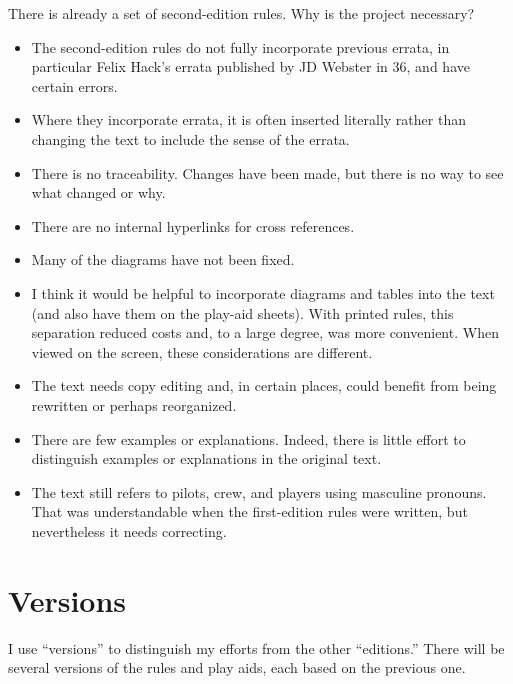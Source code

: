 \documentclass[10pt]{article}
\begin{document}
There is already a set of second-edition rules. Why is the project necessary?
\begin{itemize}
    \item The second-edition rules do not fully incorporate previous errata, in particular Felix Hack’s errata published by JD Webster in {\APJ} 36, and have certain errors.
    \item Where they incorporate errata, it is often inserted literally rather than changing the text to include the sense of the errata.
    \item There is no traceability. Changes have been made, but there is no way to see what changed or why.
    \item There are no internal hyperlinks for cross references.
    \item Many of the diagrams have not been fixed.
    \item I think it would be helpful to incorporate diagrams and tables into the text (and also have them on the play-aid sheets). With printed rules, this separation reduced costs and, to a large degree, was more convenient. When viewed on the screen, these considerations are different.
    \item The text needs copy editing and, in certain places, could benefit from being rewritten or perhaps reorganized.
    \item There are few examples or explanations. Indeed, there is little effort to distinguish examples or explanations in the original text.
    \item The text still refers to pilots, crew, and players using masculine pronouns. That was understandable when the first-edition rules were written, but nevertheless it needs correcting.
\end{itemize}

\section*{Versions}

I use “versions” to distinguish my efforts from the other “editions.” There will be several versions of the rules and play aids, each based on the previous one. 
\end{document}
